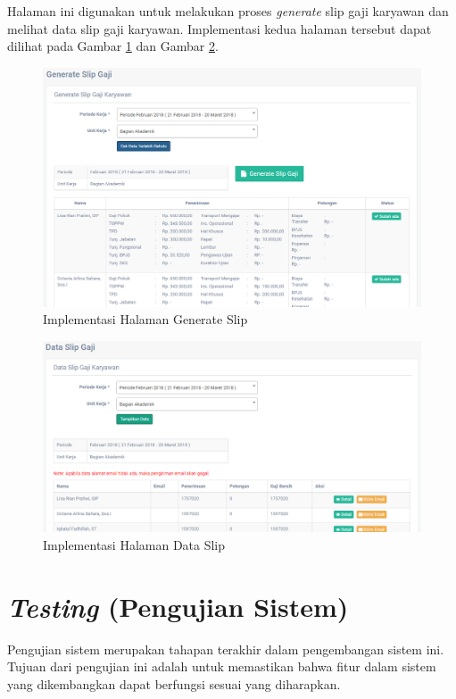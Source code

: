 \begin{enumerate}
            Halaman ini digunakan untuk melakukan proses \emph{generate} slip gaji karyawan dan melihat data slip gaji karyawan. Implementasi kedua halaman tersebut dapat dilihat pada Gambar \ref{imp_hal_generate_slip} dan Gambar \ref{imp_hal_data_slip}.
	        \begin{figure}[H]
                \centering
                \includegraphics[width=15cm]{gambar/halaman/halaman-generate-slip}
                \caption{Implementasi Halaman Generate Slip}
                \label{imp_hal_generate_slip}
            \end{figure}
            \begin{figure}[H]
                \centering
                \includegraphics[width=14cm]{gambar/halaman/halaman-data-slip}
                \caption{Implementasi Halaman Data Slip}
                \label{imp_hal_data_slip}
            \end{figure}
	    \end{enumerate}
	    
	\section{\emph{Testing} (Pengujian Sistem)}
	Pengujian sistem merupakan tahapan terakhir dalam pengembangan sistem ini. Tujuan dari pengujian ini adalah untuk memastikan bahwa fitur dalam sistem yang dikembangkan dapat berfungsi sesuai yang diharapkan.
	
